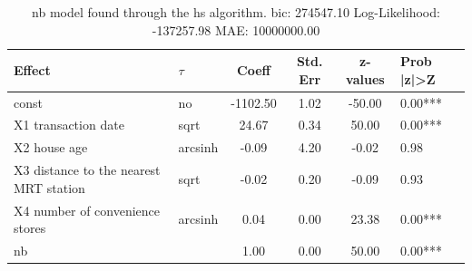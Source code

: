 \begin{table}
	\caption{nb model found through the hs algorithm. bic: 274547.10 Log-Likelihood: -137257.98 MAE: 10000000.00}
	\begin{center}
		\begin{tabular}{|l|l|c|c|c|l|}
			\hline
			Effect & $\tau$ & Coeff & Std. Err & z-values & Prob |z|>Z \\
			\hline
			const & no & -1102.50 & 1.02 & -50.00 & 0.00*** \\
			\hline
			X1 transaction date & sqrt & 24.67 & 0.34 & 50.00 & 0.00*** \\
			\hline
			X2 house age & arcsinh & -0.09 & 4.20 & -0.02 & 0.98 \\
			\hline
			X3 distance to the nearest MRT station & sqrt & -0.02 & 0.20 & -0.09 & 0.93 \\
			\hline
			X4 number of convenience stores & arcsinh & 0.04 & 0.00 & 23.38 & 0.00*** \\
			\hline
			nb &  & 1.00 & 0.00 & 50.00 & 0.00*** \\
			\hline
		\end{tabular}
	\end{center}
\end{table}